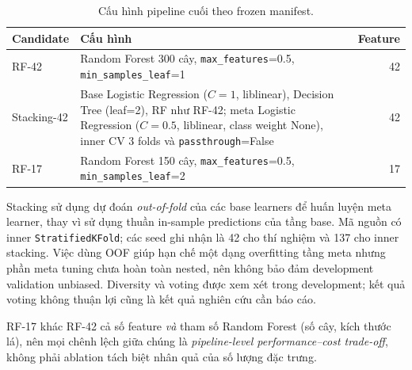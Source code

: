 \begin{table}[htbp]
\centering
\small
\caption{Cấu hình pipeline cuối theo frozen manifest.}
\label{tab:frozen-candidates}
\begin{tabular}{lp{9cm}r}
\hline
Candidate & Cấu hình & Feature \\
\hline
RF-42 & Random Forest 300 cây, \texttt{max\_features}=0.5, \texttt{min\_samples\_leaf}=1 & 42 \\
Stacking-42 & Base Logistic Regression ($C=1$, liblinear), Decision Tree (leaf=2), RF như RF-42; meta Logistic Regression ($C=0.5$, liblinear, class weight None), inner CV 3 folds và \texttt{passthrough}=False & 42 \\
RF-17 & Random Forest 150 cây, \texttt{max\_features}=0.5, \texttt{min\_samples\_leaf}=2 & 17 \\
\hline
\end{tabular}
\end{table}

Stacking sử dụng dự đoán \emph{out-of-fold} của các base learners để huấn luyện meta learner, thay vì sử dụng thuần in-sample predictions của tầng base. Mã nguồn có inner \texttt{StratifiedKFold}; các seed ghi nhận là 42 cho thí nghiệm và 137 cho inner stacking. Việc dùng OOF giúp hạn chế một dạng overfitting tầng meta nhưng phần meta tuning chưa hoàn toàn nested, nên không bảo đảm development validation unbiased. Diversity và voting được xem xét trong development; kết quả voting không thuận lợi cũng là kết quả nghiên cứu cần báo cáo.

RF-17 khác RF-42 cả số feature \emph{và} tham số Random Forest (số cây, kích thước lá), nên mọi chênh lệch giữa chúng là \emph{pipeline-level performance--cost trade-off}, không phải ablation tách biệt nhân quả của số lượng đặc trưng.


